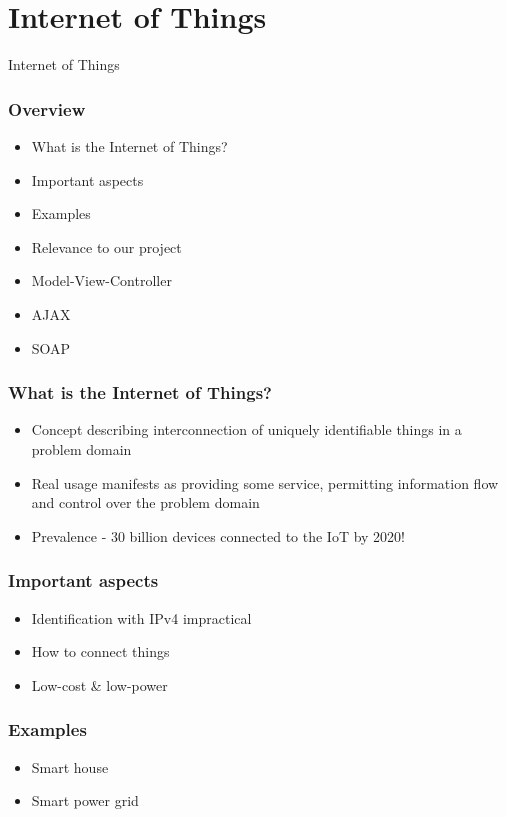 \section{Internet of Things}

\begin{frame}
\begin{center}
\Huge Internet of Things
\end{center}
\end{frame}

\begin{frame}
\frametitle{Overview}
\begin{itemize}
\item What is the Internet of Things?
\item Important aspects
\item Examples
\item Relevance to our project
\item Model-View-Controller
\item AJAX
\item SOAP
\end{itemize}
\end{frame}

\begin{frame}
\frametitle{What is the Internet of Things?}
\begin{itemize}
\item Concept describing interconnection of uniquely identifiable things in a problem domain
\item Real usage manifests as providing some service, permitting information flow and control over the problem domain
\item Prevalence - 30 billion devices connected to the IoT by 2020!
\end{itemize}
\end{frame}

\begin{frame}
\frametitle{Important aspects}
\begin{itemize}
\item Identification with IPv4 impractical
\item How to connect things
\item Low-cost \& low-power
\end{itemize}
\end{frame}

\begin{frame}
\frametitle{Examples}
\begin{itemize}
\item Smart house
\item Smart power grid
\end{itemize}
\end{frame}

